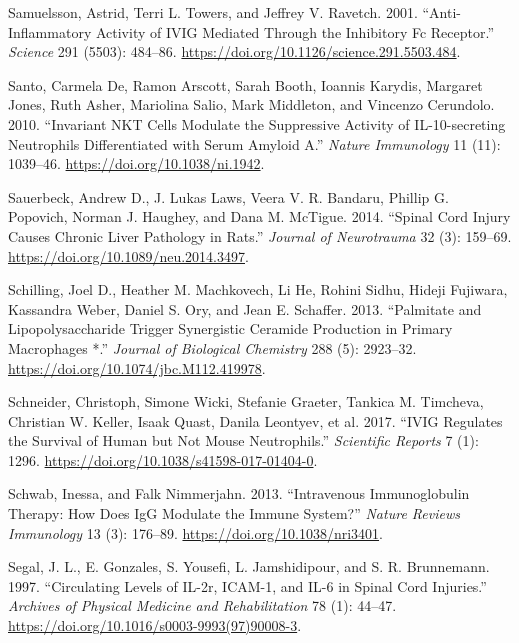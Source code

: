 \documentclass[9pt,lineno]{elife}
\newlength{\cslhangindent}
\newlength{\cslentryspacingunit} %
\newenvironment{CSLReferences}[2] %
 {%
  \setlength{\parindent}{0pt}
  \ifodd #1
  \let\oldpar\par
  \def\par{\hangindent=\cslhangindent\oldpar}
  \fi
  \setlength{\parskip}{#2\cslentryspacingunit}
 }%
 {}
\begin{document}
\begin{landscape}
\begin{landscape}
\begin{landscape}
\begin{landscape}
\begin{CSLReferences}{1}{0}
\leavevmode{}%
Samuelsson, Astrid, Terri L. Towers, and Jeffrey V. Ravetch. 2001. {``Anti-Inflammatory {Activity} of {IVIG Mediated Through} the {Inhibitory Fc Receptor}.''} \emph{Science} 291 (5503): 484--86. \url{https://doi.org/10.1126/science.291.5503.484}.

\leavevmode{}%
Santo, Carmela De, Ramon Arscott, Sarah Booth, Ioannis Karydis, Margaret Jones, Ruth Asher, Mariolina Salio, Mark Middleton, and Vincenzo Cerundolo. 2010. {``Invariant {NKT} Cells Modulate the Suppressive Activity of {IL-10-secreting} Neutrophils Differentiated with Serum Amyloid {A}.''} \emph{Nature Immunology} 11 (11): 1039--46. \url{https://doi.org/10.1038/ni.1942}.

\leavevmode{}%
Sauerbeck, Andrew D., J. Lukas Laws, Veera V. R. Bandaru, Phillip G. Popovich, Norman J. Haughey, and Dana M. McTigue. 2014. {``Spinal {Cord Injury Causes Chronic Liver Pathology} in {Rats}.''} \emph{Journal of Neurotrauma} 32 (3): 159--69. \url{https://doi.org/10.1089/neu.2014.3497}.

\leavevmode{}%
Schilling, Joel D., Heather M. Machkovech, Li He, Rohini Sidhu, Hideji Fujiwara, Kassandra Weber, Daniel S. Ory, and Jean E. Schaffer. 2013. {``Palmitate and {Lipopolysaccharide Trigger Synergistic Ceramide Production} in {Primary Macrophages} *.''} \emph{Journal of Biological Chemistry} 288 (5): 2923--32. \url{https://doi.org/10.1074/jbc.M112.419978}.

\leavevmode{}%
Schneider, Christoph, Simone Wicki, Stefanie Graeter, Tankica M. Timcheva, Christian W. Keller, Isaak Quast, Danila Leontyev, et al. 2017. {``{IVIG} Regulates the Survival of Human but Not Mouse Neutrophils.''} \emph{Scientific Reports} 7 (1): 1296. \url{https://doi.org/10.1038/s41598-017-01404-0}.

\leavevmode{}%
Schwab, Inessa, and Falk Nimmerjahn. 2013. {``Intravenous Immunoglobulin Therapy: How Does {IgG} Modulate the Immune System?''} \emph{Nature Reviews Immunology} 13 (3): 176--89. \url{https://doi.org/10.1038/nri3401}.

\leavevmode{}%
Segal, J. L., E. Gonzales, S. Yousefi, L. Jamshidipour, and S. R. Brunnemann. 1997. {``Circulating Levels of {IL-2r}, {ICAM-1}, and {IL-6} in Spinal Cord Injuries.''} \emph{Archives of Physical Medicine and Rehabilitation} 78 (1): 44--47. \url{https://doi.org/10.1016/s0003-9993(97)90008-3}.


\end{CSLReferences}
\end{landscape}
\end{landscape}
\end{landscape}
\end{landscape}
\end{document}
